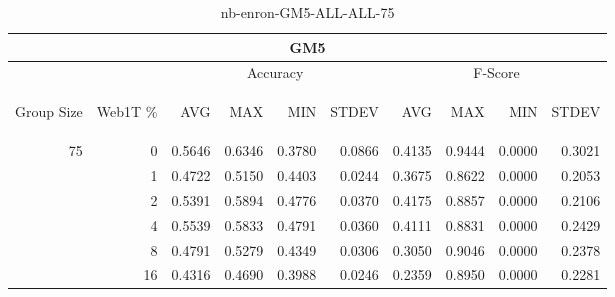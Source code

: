 \begin{center}
\begin{table}[htbp]
\begin{tabular}{ | r | r | r | r | r | r | r | r | r | r |}
\hline
\multicolumn{10}{|c|}{GM5}\\
\hline
 & & \multicolumn{4}{|c|}{Accuracy} & \multicolumn{4}{|c|}{F-Score}\\ \cline{3-10}
\begin{sideways}Group Size\end{sideways} & \begin{sideways}Web1T \%\end{sideways} & \begin{sideways}AVG\end{sideways} & \begin{sideways}MAX\end{sideways} & \begin{sideways}MIN\end{sideways} & \begin{sideways}STDEV\end{sideways} & \begin{sideways}AVG\end{sideways} & \begin{sideways}MAX\end{sideways} & \begin{sideways}MIN\end{sideways} & \begin{sideways}STDEV\end{sideways}\\
\hline
\multirow{5}{*}{75}
 & 0 & 0.5646 & 0.6346 & 0.3780 & 0.0866 & 0.4135 & 0.9444 & 0.0000 & 0.3021\\ \cline{2-10}
 & 1 & 0.4722 & 0.5150 & 0.4403 & 0.0244 & 0.3675 & 0.8622 & 0.0000 & 0.2053\\ \cline{2-10}
 & 2 & 0.5391 & 0.5894 & 0.4776 & 0.0370 & 0.4175 & 0.8857 & 0.0000 & 0.2106\\ \cline{2-10}
 & 4 & 0.5539 & 0.5833 & 0.4791 & 0.0360 & 0.4111 & 0.8831 & 0.0000 & 0.2429\\ \cline{2-10}
 & 8 & 0.4791 & 0.5279 & 0.4349 & 0.0306 & 0.3050 & 0.9046 & 0.0000 & 0.2378\\ \cline{2-10}
 & 16 & 0.4316 & 0.4690 & 0.3988 & 0.0246 & 0.2359 & 0.8950 & 0.0000 & 0.2281\\ \cline{2-10}
\hline
\end{tabular}
\caption{nb-enron-GM5-ALL-ALL-75}
\label{table:nb-enron-GM5-ALL-ALL-75}
\end{table}
\end{center}

